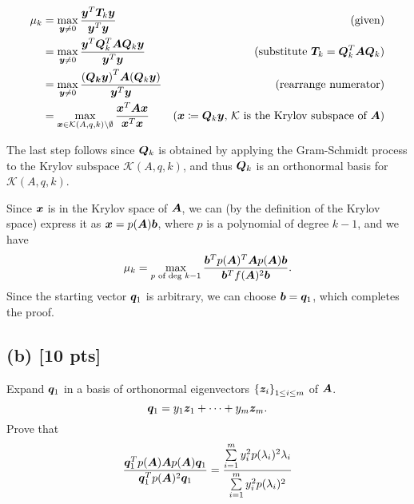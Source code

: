 \documentclass[twoside,10pt]{article}
\begin{document}
\begin{align*}
  \mu_k &= \max\limits_{\vct{y} \neq 0}\dfrac{\vct{y}^T\mtx{T}_k\vct{y}}{\vct{y}^T\vct{y}}&\text{(given)}\\
  &= \max\limits_{\vct{y} \neq 0}\dfrac{\vct{y}^T\mtx{Q}_k^T \mtx{A}\mtx{Q}_k\vct{y}}{\vct{y}^T\vct{y}}&\text{(substitute $\mtx{T}_k = \mtx{Q}^T_k \mtx{A} \mtx{Q}_k$)}\\
  &= \max\limits_{\vct{y} \neq 0}\dfrac{\left(\mtx{Q_k}\vct{y}\right)^T \mtx{A}\left(\mtx{Q}_k\vct{y}\right)}{\vct{y}^T\vct{y}}&\text{(rearrange numerator)}\\
  &= \max\limits_{\vct{x} \in \mathcal{K}(A,q,k) \setminus \emptyset}\dfrac{\vct{x}^T \mtx{A}\vct{x}}{\vct{x}^T\vct{x}}&\text{($\vct{x} \coloneqq \mtx{Q}_k\vct{y}$, $\mathcal{K}$ is the Krylov subspace of $\mtx{A}$)}\\
\end{align*}

The last step follows since $\bm{Q}_k$ is obtained by applying the Gram-Schmidt process to the Krylov subspace $\mathcal{K}(A,q,k)$, and thus $\bm{Q}_k$ is an orthonormal basis for $\mathcal{K}(A,q,k)$.

Since $\bm{x}$ is in the Krylov space of $\bm{A}$, we can (by the definition of the Krylov space) express it as $\bm{x} = p(\bm{A})\bm{b}$, where $p$ is a polynomial of degree $k - 1$, and we have
$$\mu_k = \max \limits_{p \text{ of deg } k - 1} \frac{\bm{b}^T p(\bm{A})^T\bm{A} p(\bm{A})\bm{b}}{\bm{b}^T f(\bm{A})^2\bm{b}}.$$
Since the starting vector $\bm{q}_1$ is arbitrary, we can choose $\bm{b} = \bm{q}_1$, which completes the proof.

\subsection*{(b) [10 pts]}
Expand $\bm{q}_1$ in a basis of orthonormal eigenvectors $\left\{\vct{z}_i\right\}_{1 \leq i \leq m}$ of $\bm{A}$.
\begin{equation}
  \bm{q}_1 = y_1 \bm{z}_1 + \dots + y_m \bm{z}_m. 
\end{equation}
Prove that 
\begin{equation}
  \frac{\bm{q}_1^T p(\bm{A}) \bm{A} p(\bm{A}) \bm{q}_1}{\bm{q}_1^T p(\bm{A})^2 \bm{q}_1} = \frac{\sum \limits_{i = 1}^{m} y_{i}^2 p(\lambda_i)^2 \lambda_{i}}{\sum \limits_{i = 1}^{m} y_{i}^2 p(\lambda_i)^2}
\end{equation}
\end{document}

